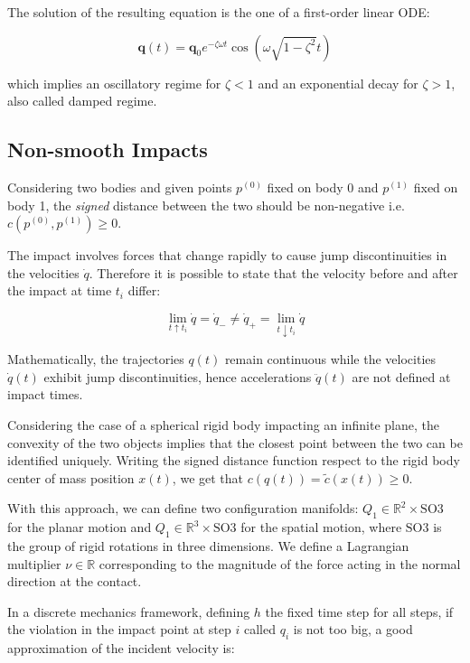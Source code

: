 The solution of the resulting equation is the one of a first-order linear \ac{ODE}:

\begin{equation}
    \mathbf{q}(t) = \mathbf{q}_0 e^{-\zeta \omega t} \cos(\omega \sqrt{1 - \zeta ^2} t)
\end{equation}

which implies an oscillatory regime for $\zeta < 1$ and an exponential decay for $\zeta > 1$, also called damped regime.

\subsection{Non-smooth Impacts}

Considering two bodies and given points $p ^{(0)}$ fixed on body 0 and $p ^{(1)}$ fixed on body 1, the \textit{signed} distance between the two should be non-negative i.e. $c(p ^{(0)}, p ^{(1)}) \geq 0$.

The impact involves forces that change rapidly to cause jump discontinuities in the velocities $\dot{q}$. Therefore it is possible to state that the velocity before and after the impact at time $t_i$ differ:

\begin{equation}
    \lim _{t \uparrow t _i} \dot{q} = \dot{q} _{-} \neq \dot{q} _{+} = \lim _{t \downarrow t _i} \dot{q}
\end{equation}

Mathematically, the trajectories $q(t)$ remain continuous while the velocities $\dot{q}(t)$ exhibit jump discontinuities, hence accelerations $\ddot{q}(t)$ are not defined at impact times.

Considering the case of a spherical rigid body impacting an infinite plane, the convexity of the two objects implies that the closest point between the two can be identified uniquely.
Writing the signed distance function respect to the rigid body center of mass position $x(t)$, we get that $c(q(t)) = \tilde{c}(x(t)) \geq 0$.

With this approach, we can define two configuration manifolds: $Q _1 \in \mathbb{R} ^2 \times \mathrm{SO}3$ for the planar motion and $Q _1 \in \mathbb{R} ^3 \times \mathrm{SO}3$ for the spatial motion, where $\mathrm{SO}3$ is the group of rigid rotations in three dimensions. We define a Lagrangian multiplier $\nu \in \mathbb{R}$ corresponding to the magnitude of the force acting in the normal direction at the contact.

In a discrete mechanics framework, defining $h$ the fixed time step for all steps, if the violation in the impact point at step $i$ called $q _i$ is not too big, a good approximation of the incident velocity is:

